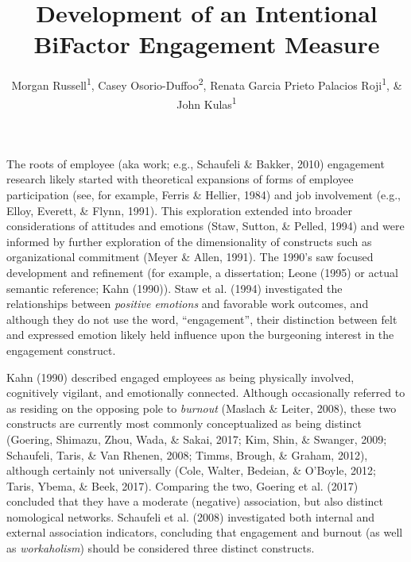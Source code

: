 \documentclass[
  english,
  man]{apa6}
\title{Development of an Intentional BiFactor Engagement Measure}
\author{Morgan Russell\textsuperscript{1}, Casey Osorio-Duffoo\textsuperscript{2}, Renata Garcia Prieto Palacios Roji\textsuperscript{1}, \& John Kulas\textsuperscript{1}}
\date{}
\affiliation{\vspace{0.5cm}\textsuperscript{1} Montclair State University\\\textsuperscript{2} Harver}
\begin{document}
\maketitle

The roots of employee (aka work; e.g., Schaufeli \& Bakker, 2010) engagement research likely started with theoretical expansions of forms of employee participation (see, for example, Ferris \& Hellier, 1984) and job involvement (e.g., Elloy, Everett, \& Flynn, 1991). This exploration extended into broader considerations of attitudes and emotions (Staw, Sutton, \& Pelled, 1994) and were informed by further exploration of the dimensionality of constructs such as organizational commitment (Meyer \& Allen, 1991). The 1990's saw focused development and refinement (for example, a dissertation; Leone (1995) or actual semantic reference; Kahn (1990)). Staw et al. (1994) investigated the relationships between \emph{positive emotions} and favorable work outcomes, and although they do not use the word, \enquote{engagement}, their distinction between felt and expressed emotion likely held influence upon the burgeoning interest in the engagement construct.

Kahn (1990) described engaged employees as being physically involved, cognitively vigilant, and emotionally connected. Although occasionally referred to as residing on the opposing pole to \emph{burnout} (Maslach \& Leiter, 2008), these two constructs are currently most commonly conceptualized as being distinct (Goering, Shimazu, Zhou, Wada, \& Sakai, 2017; Kim, Shin, \& Swanger, 2009; Schaufeli, Taris, \& Van Rhenen, 2008; Timms, Brough, \& Graham, 2012), although certainly not universally (Cole, Walter, Bedeian, \& O'Boyle, 2012; Taris, Ybema, \& Beek, 2017). Comparing the two, Goering et al. (2017) concluded that they have a moderate (negative) association, but also distinct nomological networks. Schaufeli et al. (2008) investigated both internal and external association indicators, concluding that engagement and burnout (as well as \emph{workaholism}) should be considered three distinct constructs.
\end{document}
